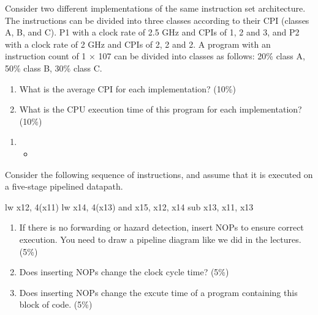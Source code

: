 \documentclass[12pt, a4paper]{article}
\begin{document}
\begin{q}{20}
    Consider two different implementations of the same instruction set architecture. The
instructions can be divided into three classes according to their CPI (classes A, B, and
C). P1 with a clock rate of 2.5 GHz and CPIs of 1, 2 and 3, and P2 with a clock rate of
2 GHz and CPIs of 2, 2 and 2. A program with an instruction count of 1 × 107 can be
divided into classes as follows: 20\% class A, 50\% class B, 30\% class C. 
\begin{enumerate}
    \item What is the average CPI for each implementation? (10\%)
    \item What is the CPU execution time of this program for each implementation? (10\%)
\end{enumerate}
\end{q}
\begin{ans}
\begin{enumerate}
    \item 
    \begin{itemize}
        \item 
    \end{itemize}
\end{enumerate}
\end{ans}
\pagebreak

\begin{q}{15}
    Consider the following sequence of instructions, and assume that it is executed on a
five-stage pipelined datapath.
\begin{code}
    lw x12, 4(x11)
    lw x14, 4(x13)
    and x15, x12, x14
    sub x13, x11, x13
\end{code}
\begin{enumerate}
    \item If there is no forwarding or hazard detection, insert NOPs to ensure correct execution.
    You need to draw a pipeline diagram like we did in the lectures. (5\%)
    \item Does inserting NOPs change the clock cycle time? (5\%)
    \item Does inserting NOPs change the excute time of a program containing this block of
    code. (5\%)
\end{enumerate}
\end{q}
\begin{ans}
    
\end{ans}
\pagebreak
\end{document}
